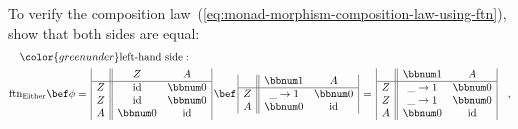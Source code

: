 To verify the composition law~(\ref{eq:monad-morphism-composition-law-using-ftn}),
show that both sides are equal:
\begin{align*}
 & \quad{\color{greenunder}\text{left-hand side}:}\quad\\
 & \text{ftn}_{\text{Either}}\bef\phi=\,\begin{array}{|c||cc|}
 & Z & A\\
\hline Z & \text{id} & \bbnum 0\\
Z & \text{id} & \bbnum 0\\
A & \bbnum 0 & \text{id}
\end{array}\,\bef\,\begin{array}{|c||cc|}
 & \bbnum 1 & A\\
\hline Z & \_\rightarrow1 & \bbnum 0\\
A & \bbnum 0 & \text{id}
\end{array}\,=\,\begin{array}{|c||cc|}
 & \bbnum 1 & A\\
\hline Z & \_\rightarrow1 & \bbnum 0\\
Z & \_\rightarrow1 & \bbnum 0\\
A & \bbnum 0 & \text{id}
\end{array}\quad,
\end{align*}
